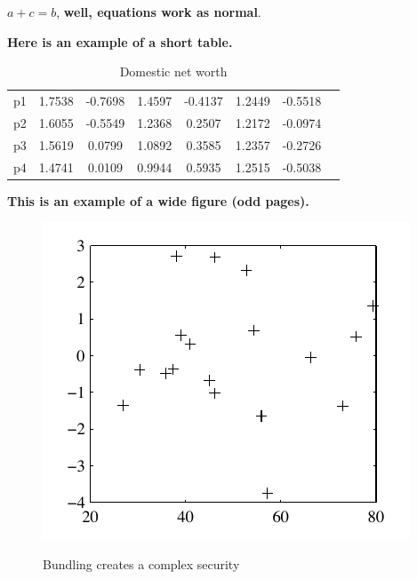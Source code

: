 \newpage
$a+c=b$, \textbf{well, equations work as normal}.

\lipsum[1]
\lipsum[2]

\textbf{Here is an example of a short table.}
\begin{table}[!htbp]
\stabbox{2.0cm}
{\caption{Domestic net worth}}
{\begin{tabular*}{\cflwidth}{@{\hspace{3pt}}@{\extracolsep{\fill}}*{8}{@{\hspace{-3pt}}c}}
    p1 & 1.7538 & -0.7698 & 1.4597 & -0.4137 & 1.2449 & -0.5518                 \\
    p2 & 1.6055 & -0.5549 & 1.2368 & 0.2507  & 1.2172 & -0.0974                 \\
    p3 & 1.5619 & 0.0799  & 1.0892 & 0.3585  & 1.2357 & -0.2726                 \\
    p4 & 1.4741 & 0.0109  & 0.9944 & 0.5935  & 1.2515 & -0.5038                 \\
\end{tabular*}
}
\end{table}

\lipsum[7]

\textbf{This is an example of a wide figure (odd pages).}
\begin{figure}[!htbp]
  \wdfigbox
  {\caption{Bundling creates a complex security}}
  {
  \includegraphics{./figure/sample.pdf}
  }
\end{figure}

